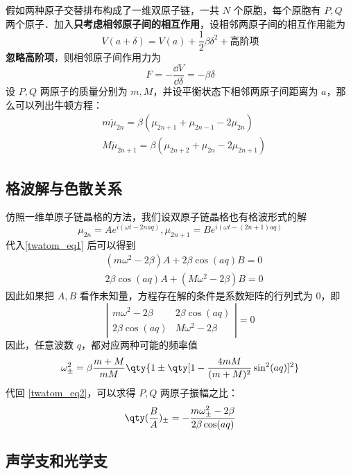 
假如两种原子交替排布构成了一维双原子链，一共 $N$ 个原胞，每个原胞有 $P,Q$ 两个原子．加入\textbf{只考虑相邻原子间的相互作用}，设相邻两原子间的相互作用能为
\begin{equation}
V(a+\delta)=V(a)+\frac{1}{2}\beta \delta^2+\text{高阶项}
\end{equation}
\textbf{忽略高阶项}，则相邻原子间作用力为
\begin{equation}
F=-\frac{\dd V}{\dd \delta}=-\beta \delta
\end{equation}
设 $P,Q$ 两原子的质量分别为 $m,M$，并设平衡状态下相邻两原子间距离为 $a$，那么可以列出牛顿方程：
\begin{equation}\label{twatom_eq1}
\begin{aligned}
&m\ddot \mu_{2n}=\beta(\mu_{2n+1}+\mu_{2n-1}-2\mu_{2n})\\
&M\ddot \mu_{2n+1}=\beta(\mu_{2n+2}+\mu_{2n}-2\mu_{2n+1})
\end{aligned}
\end{equation}
\subsection{格波解与色散关系}
仿照一维单原子链晶格的方法，我们设双原子链晶格也有格波形式的解
\begin{equation}
\mu_{2n}=A e^{i(\omega t - 2naq)},\mu_{2n+1}=B  e^{i(\omega t - (2n+1)aq)}
\end{equation}
代入\autoref{twatom_eq1} 后可以得到
\begin{equation}\label{twatom_eq2}
\begin{aligned}
&(m\omega^2-2\beta)A+2\beta\cos(aq)B=0\\
&2\beta\cos(aq)A+(M\omega^2-2\beta)B=0
\end{aligned}
\end{equation}
因此如果把 $A,B$ 看作未知量，方程存在解的条件是系数矩阵的行列式为 $0$，即
\begin{equation}
\left|
\begin{matrix}
m\omega^2-2\beta&2\beta\cos(aq)\\
2\beta\cos(aq)&M\omega^2-2\beta
\end{matrix}
\right|=0
\end{equation}
因此，任意波数 $q$，都对应两种可能的频率值
\begin{equation}
\omega_{\pm}^2=\beta\frac{m+M}{mM}\qty{1\pm \qty[1-\frac{4mM}{(m+M)^2}\sin^2(aq)]^2}
\end{equation}
代回 \autoref{twatom_eq2}，可以求得 $P,Q$ 两原子振幅之比：
\begin{equation}
\qty(\frac{B}{A})_{\pm}=-\frac{m\omega_{\pm}^2-2\beta}{2\beta\cos(aq)}
\end{equation}
\subsection{声学支和光学支}

